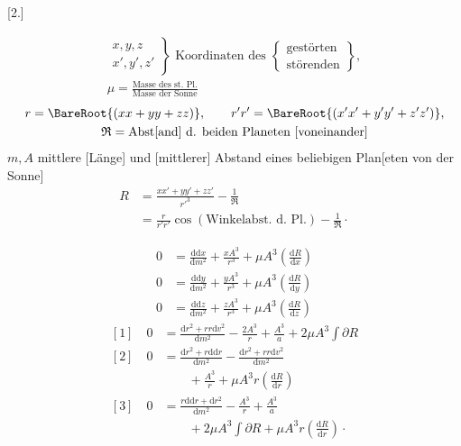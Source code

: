 \par\bigskip
\hypertarget{native-384-ceres2}{}
\begin{center}
[2.]\par
\medskip
{}
\end{center}
\[
\begin{gathered}
\left.\begin{array}{c}x,y,z\\x',y',z'\end{array}\right\}
\text{ Koordinaten des }
\left\{\begin{array}{l}\text{gestörten}\\\text{störenden}\end{array}\right\},\\[4pt]
\mu=\frac{\text{Masse des st. Pl.}}{\text{Masse der Sonne}}
\end{gathered}
\]
\[
\begin{gathered}
r=\BareRoot{(xx+yy+zz)},\qquad
r'r'=\BareRoot{(x'x'+y'y'+z'z')},\\
\mathfrak{R}=\text{Abst[and] d. beiden Planeten [voneinander]}
\end{gathered}
\]
\noindent\(m,A\) mittlere [Länge] und [mittlerer] Abstand eines beliebigen Plan[eten von der Sonne]
\[
\begin{aligned}
R&=\frac{xx'+yy'+zz'}{r'^{3}}-\frac{1}{\mathfrak{R}}\\
 &=\frac{r}{r'r'}\cos(\text{Winkelabst. d. Pl.})-\frac{1}{\mathfrak{R}}\mathpunct{\cdot}
\end{aligned}
\]
\par\medskip
\noindent\hspace*{\parindent}
\[
\begin{aligned}
0&=\frac{\mathrm{d}\mathrm{d}x}{\mathrm{d}m^{2}}+\frac{xA^{3}}{r^{3}}+\mu A^{3}\left(\frac{\mathrm{d}R}{\mathrm{d}x}\right)\\[4pt]
0&=\frac{\mathrm{d}\mathrm{d}y}{\mathrm{d}m^{2}}+\frac{yA^{3}}{r^{3}}+\mu A^{3}\left(\frac{\mathrm{d}R}{\mathrm{d}y}\right)\\[4pt]
0&=\frac{\mathrm{d}\mathrm{d}z}{\mathrm{d}m^{2}}+\frac{zA^{3}}{r^{3}}+\mu A^{3}\left(\frac{\mathrm{d}R}{\mathrm{d}z}\right)
\end{aligned}
\]
\[
\begin{aligned}
[1]\quad 0&=\frac{\mathrm{d}r^{2}+rr\mathrm{d}v^{2}}{\mathrm{d}m^{2}}-\frac{2A^{3}}{r}+\frac{A^{3}}{a}+2\mu A^{3}\int\partial R\\[6pt]
[2]\quad 0&=\frac{\mathrm{d}r^{2}+r\mathrm{d}\mathrm{d}r}{\mathrm{d}m^{2}}-\frac{\mathrm{d}r^{2}+rr\mathrm{d}v^{2}}{\mathrm{d}m^{2}}\\
&\qquad+\frac{A^{3}}{r}+\mu A^{3}r\left(\frac{\mathrm{d}R}{\mathrm{d}r}\right)\\[6pt]
[3]\quad 0&=\frac{r\mathrm{d}\mathrm{d}r+\mathrm{d}r^{2}}{\mathrm{d}m^{2}}-\frac{A^{3}}{r}+\frac{A^{3}}{a}\\
&\qquad+2\mu A^{3}\int\partial R+\mu A^{3}r\left(\frac{\mathrm{d}R}{\mathrm{d}r}\right)\mathpunct{\cdot}
\end{aligned}
\]

